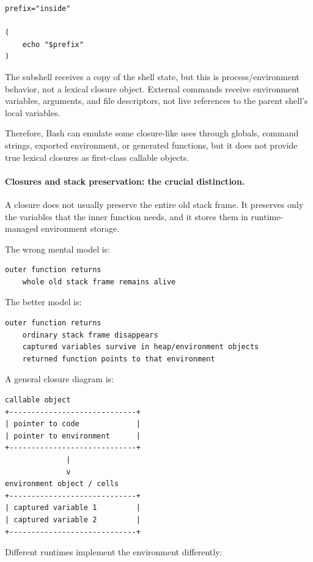 \begin{verbatim}
prefix="inside"

(
    echo "$prefix"
)
\end{verbatim}

The subshell receives a copy of the shell state, but this is process/environment behavior, not a lexical closure object. External commands receive environment variables, arguments, and file descriptors, not live references to the parent shell's local variables.

Therefore, Bash can emulate some closure-like uses through globals, command strings, exported environment, or generated functions, but it does not provide true lexical closures as first-class callable objects.

\paragraph{Closures and stack preservation: the crucial distinction.}

A closure does not usually preserve the entire old stack frame. It preserves only the variables that the inner function needs, and it stores them in runtime-managed environment storage.

The wrong mental model is:

\begin{verbatim}
outer function returns
    whole old stack frame remains alive
\end{verbatim}

The better model is:

\begin{verbatim}
outer function returns
    ordinary stack frame disappears
    captured variables survive in heap/environment objects
    returned function points to that environment
\end{verbatim}

A general closure diagram is:

\begin{verbatim}
callable object
+-----------------------------+
| pointer to code             |
| pointer to environment      |
+-----------------------------+
              |
              v
environment object / cells
+-----------------------------+
| captured variable 1         |
| captured variable 2         |
+-----------------------------+
\end{verbatim}

Different runtimes implement the environment differently:

